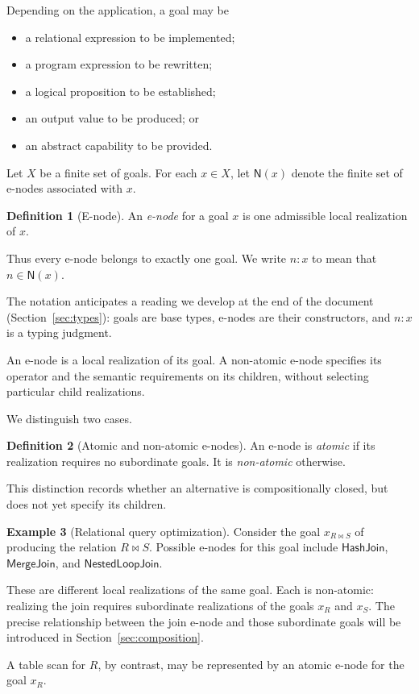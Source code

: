 \documentclass[sigconf,nonacm]{acmart}
\theoremstyle{definition}
\newtheorem{definition}{Definition}[section]
\newtheorem{example}[definition]{Example}
\theoremstyle{plain}
\theoremstyle{remark}
\begin{document}
Depending on the
application, a goal may be

\begin{itemize}
\item a relational expression to be implemented;
\item a program expression to be rewritten;
\item a logical proposition to be established;
\item an output value to be produced; or
\item an abstract capability to be provided.
\end{itemize}

Let \(X\) be a finite set of goals.  For each \(x \in X\), let
\(\mathsf{N}(x)\) denote the finite set of e-nodes associated with
\(x\).

\begin{definition}[E-node]
An \emph{e-node} for a goal \(x\) is one admissible local realization
of \(x\).
\end{definition}

Thus every e-node belongs to exactly one goal.  We write \(n : x\)
to mean that \(n \in \mathsf{N}(x)\).

The notation anticipates a reading we develop at the end of the
document (Section~\ref{sec:types}): goals are base types, e-nodes
are their constructors, and \(n:x\) is a typing judgment.

An e-node is a local realization of its goal.  A non-atomic e-node
specifies its operator and the semantic requirements on its children,
without selecting particular child realizations.

We distinguish two cases.

\begin{definition}[Atomic and non-atomic e-nodes]
An e-node is \emph{atomic} if its realization requires no subordinate
goals.  It is \emph{non-atomic} otherwise.
\end{definition}

This distinction records whether an alternative is compositionally
closed, but does not yet specify its children.

\begin{example}[Relational query optimization]
Consider the goal \(x_{R \Join S}\) of producing the relation
\(R \Join S\).  Possible e-nodes for this goal include
\(\mathsf{HashJoin}\), \(\mathsf{MergeJoin}\), and
\(\mathsf{NestedLoopJoin}\).

These are different local realizations of the same goal.  Each is
non-atomic: realizing the join requires subordinate realizations of
the goals \(x_R\) and \(x_S\).  The precise relationship between the
join e-node and those subordinate goals will be introduced in
Section~\ref{sec:composition}.

A table scan for \(R\), by contrast, may be represented by an atomic
e-node for the goal \(x_R\).
\end{example}
\end{document}
